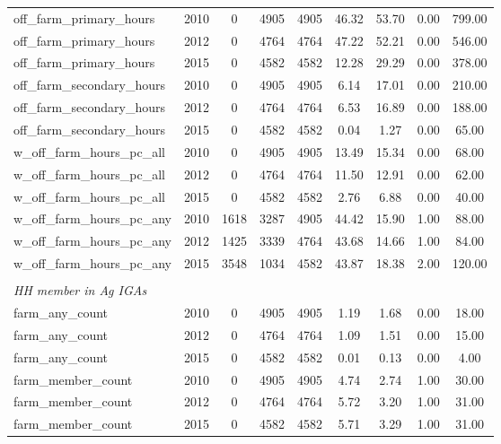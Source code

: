 \documentclass[a4paper,11pt]{article}
\begin{document}
\begin{table}[htbp]
{\begin{tabular}{lcccccccc}
  off\_farm\_primary\_hours & 2010  & 0     & 4905  & 4905  & 46.32 & 53.70 & 0.00  & 799.00 \\
    off\_farm\_primary\_hours & 2012  & 0     & 4764  & 4764  & 47.22 & 52.21 & 0.00  & 546.00 \\
    off\_farm\_primary\_hours & 2015  & 0     & 4582  & 4582  & 12.28 & 29.29 & 0.00  & 378.00 \\
    off\_farm\_secondary\_hours & 2010  & 0     & 4905  & 4905  & 6.14  & 17.01 & 0.00  & 210.00 \\
    off\_farm\_secondary\_hours & 2012  & 0     & 4764  & 4764  & 6.53  & 16.89 & 0.00  & 188.00 \\
    off\_farm\_secondary\_hours & 2015  & 0     & 4582  & 4582  & 0.04  & 1.27  & 0.00  & 65.00 \\

 w\_off\_farm\_hours\_pc\_all & 2010  & 0     & 4905  & 4905  & 13.49 & 15.34 & 0.00  & 68.00 \\
    w\_off\_farm\_hours\_pc\_all & 2012  & 0     & 4764  & 4764  & 11.50 & 12.91 & 0.00  & 62.00 \\
    w\_off\_farm\_hours\_pc\_all & 2015  & 0     & 4582  & 4582  & 2.76  & 6.88  & 0.00  & 40.00 \\
    w\_off\_farm\_hours\_pc\_any & 2010  & 1618  & 3287  & 4905  & 44.42 & 15.90 & 1.00  & 88.00 \\
    w\_off\_farm\_hours\_pc\_any & 2012  & 1425  & 3339  & 4764  & 43.68 & 14.66 & 1.00  & 84.00 \\
    w\_off\_farm\_hours\_pc\_any & 2015  & 3548  & 1034  & 4582  & 43.87 & 18.38 & 2.00  & 120.00 \\

    
        & & & & & & & & \\

    \textit{HH member in Ag IGAs}  & & &  &  & & & \\ 

    farm\_any\_count & 2010  & 0     & 4905  & 4905  & 1.19  & 1.68  & 0.00  & 18.00 \\
    farm\_any\_count & 2012  & 0     & 4764  & 4764  & 1.09  & 1.51  & 0.00  & 15.00 \\
    farm\_any\_count & 2015  & 0     & 4582  & 4582  & 0.01  & 0.13  & 0.00  & 4.00 \\

      farm\_member\_count & 2010  & 0     & 4905  & 4905  & 4.74  & 2.74  & 1.00  & 30.00 \\
    farm\_member\_count & 2012  & 0     & 4764  & 4764  & 5.72  & 3.20  & 1.00  & 31.00 \\
    farm\_member\_count & 2015  & 0     & 4582  & 4582  & 5.71  & 3.29  & 1.00  & 31.00 \\



\end{tabular}}
\end{table}
\end{document}
